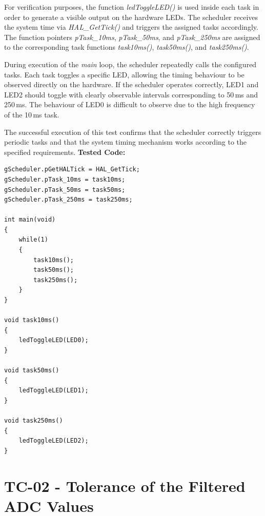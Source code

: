 For verification purposes, the function \textit{ledToggleLED()} is used inside each task 
in order to generate a visible output on the hardware LEDs. The scheduler receives the 
system time via \textit{HAL\_GetTick()} and triggers the assigned tasks accordingly. 
The function pointers \textit{pTask\_10ms}, \textit{pTask\_50ms}, and \textit{pTask\_250ms} 
are assigned to the corresponding task functions \textit{task10ms()}, 
\textit{task50ms()}, and \textit{task250ms()}.

During execution of the \textit{main} loop, the scheduler repeatedly calls the configured 
tasks. Each task toggles a specific LED, allowing the timing behaviour to be observed 
directly on the hardware. If the scheduler operates correctly, LED1 and LED2 should toggle 
with clearly observable intervals corresponding to 50\,ms and 250\,ms. The behaviour of 
LED0 is difficult to observe due to the high frequency of the 10\,ms task.

The successful execution of this test confirms that the scheduler correctly triggers 
periodic tasks and that the system timing mechanism works according to the specified 
requirements.
\newpage
\textbf{Tested Code:}

\begin{lstlisting}[style=CStyle]
gScheduler.pGetHALTick = HAL_GetTick;
gScheduler.pTask_10ms = task10ms;
gScheduler.pTask_50ms = task50ms;
gScheduler.pTask_250ms = task250ms;

int main(void)
{
    while(1)
    {
        task10ms();
        task50ms();
        task250ms();
    }
}

void task10ms()
{
    ledToggleLED(LED0);
}

void task50ms()
{
    ledToggleLED(LED1);
}

void task250ms()
{
    ledToggleLED(LED2);
}
\end{lstlisting}
\newpage

\section{TC-02 - Tolerance of the Filtered ADC Values}

\renewcommand{\arraystretch}{1.4}

